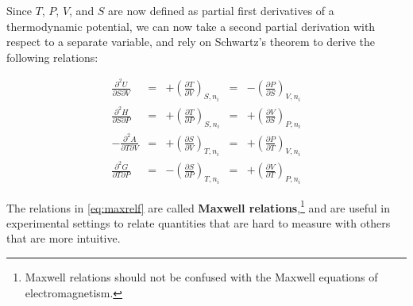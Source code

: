 \documentclass[
  9pt,
]{extbook}
\theoremstyle{definition}
\theoremstyle{definition}
\theoremstyle{definition}
\theoremstyle{definition}
\theoremstyle{remark}
\begin{document}
Since \(T\), \(P\), \(V\), and \(S\) are now defined as partial first derivatives of a thermodynamic potential, we can now take a second partial derivation with respect to a separate variable, and rely on Schwartz's theorem to derive the following relations:

\begin{equation}
\begin{aligned}
\frac{\partial^2 U }{\partial S \partial V} &=& +\left(\frac{\partial T}{\partial V}\right)_{S,n_{i}} &=& -\left(\frac{\partial P}{\partial S}\right)_{V,n_{i}}   \\
\frac{\partial^2 H }{\partial S \partial P} &=& +\left(\frac{\partial T}{\partial P}\right)_{S,n_{i}} &=& +\left(\frac{\partial V}{\partial S}\right)_{P,n_{i}}  \\
-\frac{\partial^2 A }{\partial T \partial V} &=& +\left(\frac{\partial S}{\partial V}\right)_{T,n_{i}} &=& +\left(\frac{\partial P}{\partial T}\right)_{V,n_{i}}  \\
\frac{\partial^2 G }{\partial T \partial P} &=& -\left(\frac{\partial S}{\partial P}\right)_{T,n_{i}} &=& +\left(\frac{\partial V}{\partial T}\right)_{P,n_{i}}
\end{aligned}
\label{eq:maxrelf}
\end{equation}

The relations in \eqref{eq:maxrelf} are called \textbf{Maxwell relations},\footnote{Maxwell relations should not be confused with the Maxwell equations of electromagnetism.} and are useful in experimental settings to relate quantities that are hard to measure with others that are more intuitive.
\end{document}
